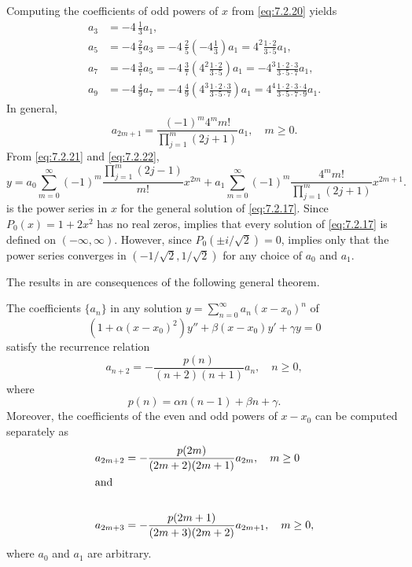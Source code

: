 \begin{solution}
Computing the coefficients of odd powers of $x$ from \eqref{eq:7.2.20}
yields
\begin{align*}
a_3&=-4\,\frac{1}{3}a_1, \\[5pt]
a_5&=-4\,\frac{2}{5}a_3=-4\,\frac{2}{5}\left(-4\frac{1}{3}\right)a_1
=4^2\frac{1\cdot2}{3\cdot5}a_1,\\
a_7&=-4\,\frac{3}{7}a_5=-4\,\frac{3}{7}\left(
4^2\frac{1\cdot2}{3\cdot5}\right)a_1=
-4^3\frac{1\cdot2\cdot3}{3\cdot5\cdot7}a_1,\\[5pt]
a_9&=-4\, \frac{4}{9}a_7=-4\, \frac{4}{9}\left(
4^3\frac{1\cdot2\cdot3}{3\cdot5\cdot7}\right)a_1=
4^4\frac{1\cdot2\cdot3\cdot4}{3\cdot5\cdot7\cdot9}a_1.
\end{align*}
In general,
\begin{equation}\label{eq:7.2.22}
a_{2m+1}=\frac{(-1)^m4^m m!}{\prod_{j=1}^m(2j+1)}a_1,\quad m\ge0.
\end{equation}
From \eqref{eq:7.2.21} and \eqref{eq:7.2.22},
\[
y=a_0
 \sum^\infty_{m=0}(-1)^m\frac{\prod_{j=1}^m(2j-1)}{m!}x^{2m}
+a_1 \sum^\infty_{m=0}(-1)^m\frac{4^mm!}{\prod_{j=1}^m(2j+1)}
 x^{2m+1}.
\]
is the power series in $x$ for the general solution of \eqref{eq:7.2.17}.
Since $P_0(x)=1+2x^2$ has no real zeros,  implies
that every solution of \eqref{eq:7.2.17} is defined on $(-\infty,\infty)$.
However, since $P_0(\pm i/\sqrt2)=0$,  implies
only that the power series converges in $(-1/\sqrt2,1/\sqrt2)$ for any
choice of $a_0$ and $a_1$.
\end{solution}

The results in  are
consequences of the following general theorem.

\begin{theorem}\label{thmtype:7.2.2}
The coefficients $\{a_n\}$ in any solution
$y=\sum_{n=0}^\infty a_n(x-x_0)^n$ of
\begin{equation}\label{eq:7.2.23}
\left(1+\alpha(x-x_0)^2\right)y''+\beta(x-x_0) y'+\gamma y=0
\end{equation}
satisfy the recurrence relation
\begin{equation}\label{eq:7.2.24}
a_{n+2}=-\frac{p(n)}{(n+2)(n+1)}a_n,\quad  n\ge0,
\end{equation}
where
\begin{equation}\label{eq:7.2.25}
p(n)=\alpha n(n-1) +\beta n+\gamma.
\end{equation}
Moreover, the coefficients of the even and odd powers of $x-x_0$ can
be computed separately as
\begin{align}
a_{2m+2}&=-\frac{p(2m)}{(2m+2)(2m+1)}a_{2m},\quad m\ge0\label{eq:7.2.26}\\
\shortintertext{and}\\
a_{2m+3}&=-\frac{p(2m+1)}{(2m+3)(2m+2)}a_{2m+1},\quad m\ge0, \label{eq:7.2.27}
\end{align}
where $a_0$ and $a_1$ are arbitrary.
\end{theorem}

